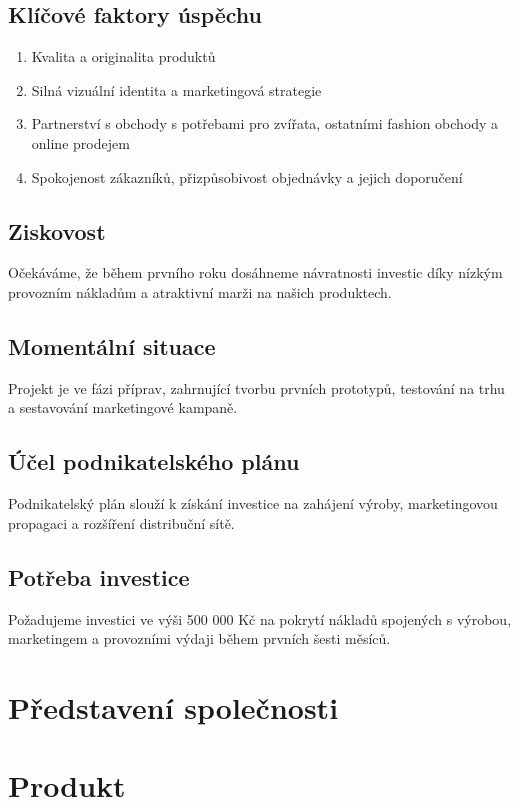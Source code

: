 \documentclass[12pt, a4paper]{article}
\begin{document}
\subsection{Klíčové faktory úspěchu}

\begin{enumerate}
  \item Kvalita a originalita produktů
  \item Silná vizuální identita a marketingová strategie
  \item Partnerství s obchody s potřebami pro zvířata, ostatními fashion obchody a online prodejem
  \item Spokojenost zákazníků, přizpůsobivost objednávky a jejich doporučení
\end{enumerate}

\subsection{Ziskovost}
Očekáváme, že během prvního roku dosáhneme návratnosti investic díky 
nízkým provozním nákladům 
a atraktivní marži na našich produktech.

\subsection{Momentální situace}
Projekt je ve fázi příprav, zahrnující tvorbu prvních prototypů, 
testování na trhu a sestavování marketingové kampaně.

\subsection{Účel podnikatelského plánu}
Podnikatelský plán slouží k získání investice na zahájení výroby, 
marketingovou propagaci a rozšíření distribuční sítě.

\subsection{Potřeba investice}
Požadujeme investici ve výši 500 000 Kč na pokrytí nákladů spojených 
s výrobou, marketingem a provozními výdaji během prvních šesti měsíců.

\section{Představení společnosti}
\section{Produkt}
\end{document}
